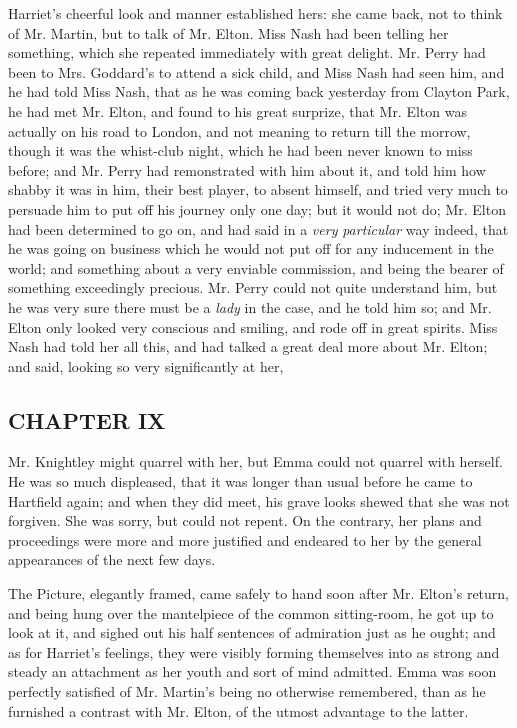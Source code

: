 Harriet's cheerful look and manner established hers: she came back, not to think of Mr. Martin, but to talk of Mr. Elton. Miss Nash had been telling her something, which she repeated immediately with great delight. Mr. Perry had been to Mrs. Goddard's to attend a sick child, and Miss Nash had seen him, and he had told Miss Nash, that as he was coming back yesterday from Clayton Park, he had met Mr. Elton, and found to his great surprize, that Mr. Elton was actually on his road to London, and not meaning to return till the morrow, though it was the whist-club night, which he had been never known to miss before; and Mr. Perry had remonstrated with him about it, and told him how shabby it was in him, their best player, to absent himself, and tried very much to persuade him to put off his journey only one day; but it would not do; Mr. Elton had been determined to go on, and had said in a {\em very} {\em particular} way indeed, that he was going on business which he would not put off for any inducement in the world; and something about a very enviable commission, and being the bearer of something exceedingly precious. Mr. Perry could not quite understand him, but he was very sure there must be a {\em lady} in the case, and he told him so; and Mr. Elton only looked very conscious and smiling, and rode off in great spirits. Miss Nash had told her all this, and had talked a great deal more about Mr. Elton; and said, looking so very significantly at her, 

\subsection[chapter-ix]{\useURL[url9][][][]\from[url9]CHAPTER IX}

Mr. Knightley might quarrel with her, but Emma could not quarrel with herself. He was so much displeased, that it was longer than usual before he came to Hartfield again; and when they did meet, his grave looks shewed that she was not forgiven. She was sorry, but could not repent. On the contrary, her plans and proceedings were more and more justified and endeared to her by the general appearances of the next few days.

The Picture, elegantly framed, came safely to hand soon after Mr. Elton's return, and being hung over the mantelpiece of the common sitting-room, he got up to look at it, and sighed out his half sentences of admiration just as he ought; and as for Harriet's feelings, they were visibly forming themselves into as strong and steady an attachment as her youth and sort of mind admitted. Emma was soon perfectly satisfied of Mr. Martin's being no otherwise remembered, than as he furnished a contrast with Mr. Elton, of the utmost advantage to the latter.

